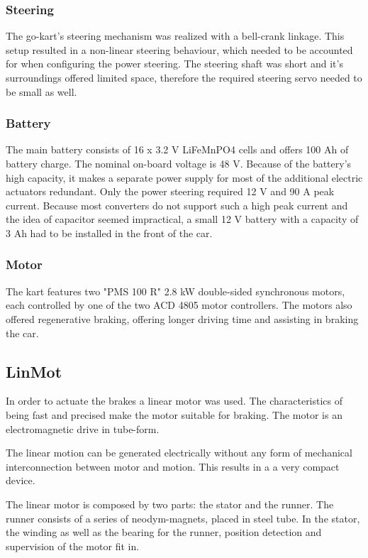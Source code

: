 \subsubsection{Steering}
The go-kart's steering mechanism was realized with a bell-crank linkage. This setup resulted in a non-linear steering behaviour, which needed to be accounted for when configuring the power steering. The steering shaft was short and it's surroundings offered limited space, therefore the required steering servo needed to be small as well.


\subsubsection{Battery}
The main battery consists of 16 x 3.2 V LiFeMnPO4 cells and offers 100 Ah of battery charge. The nominal on-board voltage is 48 V. Because of the battery's high capacity, it makes a separate power supply for most of the additional electric actuators redundant. Only the power steering required 12 V and 90 A peak current. Because most converters do not support such a high peak current and the idea of capacitor seemed impractical, a small 12 V battery with a capacity of 3 Ah had to be installed in the front of the car.

\subsubsection{Motor}
The kart features two "PMS 100 R" 2.8 kW double-sided synchronous motors, each controlled by one of the two ACD 4805 motor controllers. The motors also offered regenerative braking, offering longer driving time and assisting in braking the car.

\subsection{LinMot}
In order to actuate the brakes a linear motor was used. The characteristics of being fast and precised make the motor suitable for braking. The motor is an electromagnetic drive in tube-form. 

The linear motion can be generated electrically without any form of mechanical interconnection between motor and motion. This results in a a very compact device.

The linear motor is composed by two parts: the stator and the runner.
The runner consists of a series of neodym-magnets, placed in steel tube. In the stator, the winding as well as the bearing for the runner, position detection and supervision of the motor fit in.

